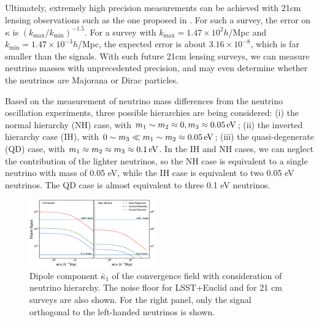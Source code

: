 \documentclass[aps,prl,twocolumn,showpacs,superscriptaddress,groupedaddress,nofootinbib]{revtex4}  %
\newcommand{\mr}{\mathrm}
\newcommand{\eV}{\ensuremath{\,{\rm eV}}}
\begin{document}
Ultimately, extremely high precision measurements can be achieved with
21cm lensing observations such as the one proposed in \cite{KiyoUeLi}.
For such a survey, the error on $\kappa$ is $(k_\mr{max}/k_\mr{min})^{-1.5}$.  
For a survey with $k_\mr{max}=1.47\times10^2h$/Mpc and
$k_\mr{min}=1.47\times10^{-3}h$/Mpc, the expected error is about
$3.16\times10^{-8}$, which is far smaller than the signals. With such
future 21cm lensing surveys, we can measure neutrino masses with
unprecedented precision, and may even determine whether the neutrinos  
are Majorana or Dirac particles.

Based on the measurement of neutrino mass differences from the neutrino
oscillation experiments, three possible hierarchies are being considered:
(i) the normal hierarchy (NH) case, with $m_1\sim m_2 \approx 0, m_3 \approx 
0.05 \eV$; (ii) the inverted hierarchy case (IH), with 
$0 \sim m_3 \ll m_1 \sim m_2 \approx 0.05 \eV$;
(iii) the quasi-degenerate (QD) case, with
 $m_1 \approx m_2 \approx m_3 \approx 0.1\eV$. 
In the IH and NH cases, we can neglect the contribution of the 
lighter neutrinos, so the NH case is equivalent to a single neutrino 
with mass of 0.05 eV, while the IH case is equivalent to two 0.05 eV neutrinos.
The QD case is almost equivalent to three 0.1 eV neutrinos.

\begin{figure}[tbp]
\begin{center}
\includegraphics[width=0.48\textwidth]{fig_4.eps}
\end{center}
\vspace{-0.7cm}
\caption{\label{fig:kappa1} Dipole component $\bar{\kappa}_1$ 
    of the convergence
    field with consideration of neutrino hierarchy.  The noise floor
    for LSST+Euclid and for 21 cm surveys are also shown.   For the
    right panel, only the signal orthogonal to the left-handed
    neutrinos is shown.
}
\end{figure}
\end{document}
